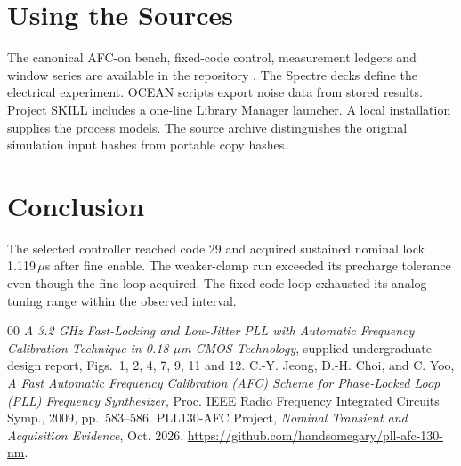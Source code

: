 \documentclass[10pt,conference,letterpaper]{IEEEtran}
\begin{document}
\section{Using the Sources}
The canonical AFC-on bench, fixed-code control, measurement ledgers and window series are available in the repository \cite{evidence}. The Spectre decks define the electrical experiment. OCEAN scripts export noise data from stored results. Project SKILL includes a one-line Library Manager launcher. A local installation supplies the process models. The source archive distinguishes the original simulation input hashes from portable copy hashes.



\section{Conclusion}
The selected controller reached code 29 and acquired sustained nominal lock 1.119\,$\mu$s after fine enable. The weaker-clamp run exceeded its precharge tolerance even though the fine loop acquired. The fixed-code loop exhausted its analog tuning range within the observed interval.
\begin{thebibliography}{00}
 \emph{A 3.2 GHz Fast-Locking and Low-Jitter PLL with Automatic Frequency Calibration Technique in 0.18-$\mu$m CMOS Technology}, supplied undergraduate design report, Figs.~1, 2, 4, 7, 9, 11 and 12.
 C.-Y. Jeong, D.-H. Choi, and C. Yoo, \emph{A Fast Automatic Frequency Calibration (AFC) Scheme for Phase-Locked Loop (PLL) Frequency Synthesizer}, Proc. IEEE Radio Frequency Integrated Circuits Symp., 2009, pp.~583--586.
 PLL130-AFC Project, \emph{Nominal Transient and Acquisition Evidence}, Oct. 2026. \url{https://github.com/handsomegary/pll-afc-130-nm}.
\end{thebibliography}
\end{document}
